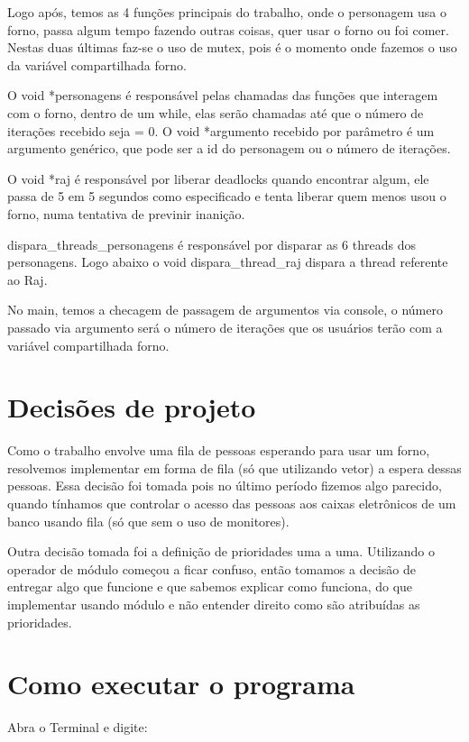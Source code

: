 \documentclass[12pt]{article}
\begin{document}
Logo após, temos as 4 funções principais do trabalho, onde o personagem usa o forno, passa algum tempo fazendo outras coisas, quer usar o forno ou foi comer. Nestas duas últimas faz-se o uso de mutex, pois é o momento onde fazemos o uso da variável compartilhada forno.

O void *personagens é responsável pelas chamadas das funções que interagem com o forno, dentro de um while, elas serão chamadas até que o número de iterações recebido seja = 0. O void *argumento recebido por parâmetro é um argumento genérico, que pode ser a id do personagem ou o número de iterações.

O void *raj é responsável por liberar deadlocks quando encontrar algum, ele passa de 5 em 5 segundos como especificado e tenta liberar quem menos usou o forno, numa tentativa de previnir inanição.

dispara\_threads\_personagens é responsável por disparar as 6 threads dos personagens. Logo abaixo o void dispara\_thread\_raj dispara a thread referente ao Raj.

No main, temos a checagem de passagem de argumentos via console, o número passado via argumento será o número de iterações que os usuários terão com a variável compartilhada forno.

\section{Decisões de projeto}

Como o trabalho envolve uma fila de pessoas esperando para usar um forno, resolvemos implementar em forma de fila (só que utilizando vetor) a espera dessas pessoas. Essa decisão foi tomada pois no último período fizemos algo parecido, quando tínhamos que controlar o acesso das pessoas aos caixas eletrônicos de um banco usando fila (só que sem o uso de monitores).

Outra decisão tomada foi a definição de prioridades uma a uma. Utilizando o operador de módulo começou a ficar confuso, então tomamos a decisão de entregar algo que funcione e que sabemos explicar como funciona, do que implementar usando módulo e não entender direito como são atribuídas as prioridades.

\section{Como executar o programa}

    Abra o Terminal e digite:
\end{document}
